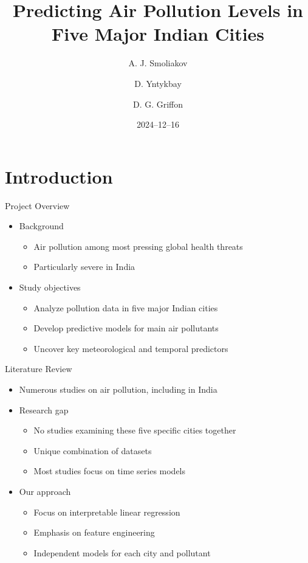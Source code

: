 \documentclass[svgnames, 12pt]{beamer}
\title[Air Pollution in India]{Predicting Air Pollution Levels in Five Major Indian Cities}
\author{A. J. Smoliakov \and D. Yntykbay \and D. G. Griffon}
\institute[VU]{Data Science Study Programme\\Faculty of Mathematics and Informatics}
\date{2024--12--16}
\begin{document}
\begin{frame}
\titlepage
\end{frame}


\section{Introduction}

\begin{frame}{Project Overview}
    \begin{itemize}
        \item Background
            \begin{itemize}
                \item Air pollution among most pressing global health threats
                \item Particularly severe in India
            \end{itemize}
        \vspace{1em}
        \item Study objectives
            \begin{itemize}
                \item Analyze pollution data in five major Indian cities
                \item Develop predictive models for main air pollutants
                \item Uncover key meteorological and temporal predictors
            \end{itemize}
    \end{itemize}
    \vfill
 \end{frame}


\begin{frame}{Literature Review}
    \begin{itemize}
        \item Numerous studies on air pollution, including in India
        \item Research gap
            \begin{itemize}
                \item No studies examining these five specific cities together
                \item Unique combination of datasets
                \item Most studies focus on time series models
            \end{itemize}
        \item Our approach
            \begin{itemize}
                \item Focus on interpretable linear regression
                \item Emphasis on feature engineering
                \item Independent models for each city and pollutant
            \end{itemize}
    \end{itemize}
\end{frame}
\end{document}
